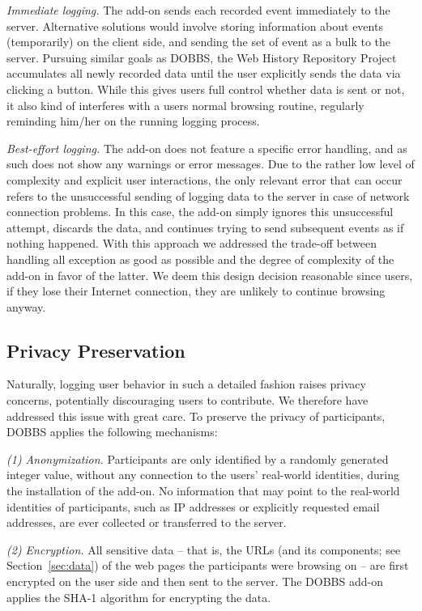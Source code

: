 \documentclass[11pt,fleqn,twoside]{article}
\begin{document}
\textit{Immediate logging.} 
The add-on sends each recorded event immediately to the server. Alternative solutions would involve storing information about events (temporarily) on the client side, and sending the set of event as a bulk to the server. Pursuing similar goals as DOBBS, the Web History Repository Project~\cite{Herder11WHR} accumulates all newly recorded data until the user explicitly sends the data via clicking a button. While this gives users full control whether data is sent or not, it also kind of interferes with a users normal browsing routine, regularly reminding him/her on the running logging process.


\textit{Best-effort logging.}
The add-on does not feature a specific error handling, and as such does not show any warnings or error messages. Due to the rather low level of complexity and explicit user interactions, the only relevant error that can occur refers to the unsuccessful sending of logging data to the server in case of network connection problems. In this case, the add-on simply ignores this unsuccessful attempt, discards the data, and continues trying to send subsequent events as if nothing happened. With this approach we addressed the trade-off between handling all exception as good as possible and the degree of complexity of the add-on in favor of the latter. We deem this design decision reasonable since users, if they lose their Internet connection, they are unlikely to continue browsing anyway. 


\subsection{Privacy Preservation}
\label{sec:dobbs-privacy}
Naturally, logging user behavior in such a detailed fashion raises privacy concerns, potentially discouraging users to contribute. We therefore have addressed this issue with great care. To preserve the privacy of participants, DOBBS applies the following mechanisms:

\textit{(1) Anonymization.}
Participants are only identified by a randomly generated integer value, without any connection to the users' real-world identities, during the installation of the add-on. No information that may point to the real-world identities of participants, such as IP addresses or explicitly requested email addresses, are ever collected or transferred to the server.

\textit{(2) Encryption.}
All sensitive data -- that is, the URLs (and its components; see Section~\ref{sec:data}) of the web pages the participants were browsing on -- are first encrypted on the user side and then sent to the server. The DOBBS add-on applies the SHA-1 algorithm for encrypting the data.
\end{document}

